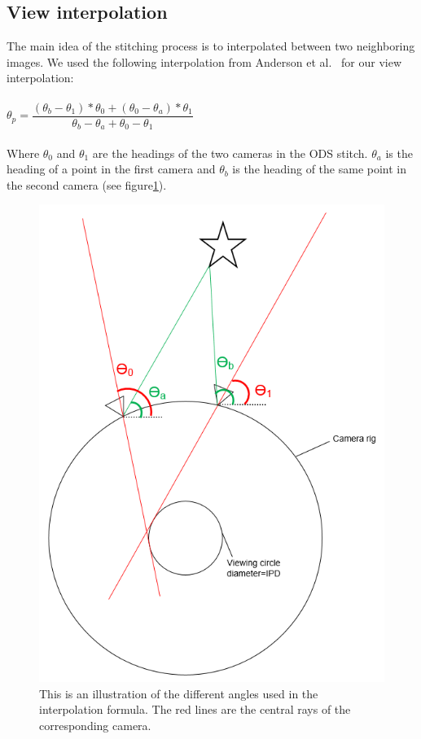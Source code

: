 \documentclass[10pt,twocolumn,letterpaper]{article}
\begin{document}
\subsection{View interpolation}
The main idea of the stitching process is to interpolated between two neighboring images.
We used the following interpolation from Anderson et al.~\cite{jump16} for our view interpolation:\\
\\
$\theta_p=\dfrac{(\theta_{b}-\theta_{1})*\theta_{0}+(\theta_{0}-\theta_{a})*\theta_{1}}{\theta_{b}-\theta_{a}+\theta_{0}-\theta_{1}}$
\\
\\
Where $\theta_ {0}$ and $\theta_ {1}$ are the headings of the two cameras in the ODS stitch. $\theta_ {a}$ is the heading of a point in the first camera and $\theta_ {b}$ is the heading of the same point in the second camera (see figure\ref{interpolation}).

\begin{figure}[t]
\begin{center}
   \includegraphics[width=0.7\linewidth]{pictures/interpolation.PNG}
\end{center}
   \caption{This is an illustration of the different angles used in the interpolation formula. The red lines are the central rays of the corresponding camera.}
\label{interpolation}
\end{figure}
\end{document}
